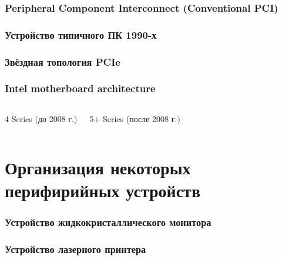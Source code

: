 \begin{frame}
\frametitle{Peripheral Component Interconnect (Conventional PCI)}
\end{frame}

\begin{frame}
\frametitle{Устройство типичного ПК 1990-х}
\end{frame}

\begin{frame}
\frametitle{Звёздная топология PCIe}
\end{frame}

\begin{frame}
\frametitle{Intel motherboard architecture}
\begin{columns}
    \column{6.3cm} 4 Series  (до 2008 г.) \\

    \pause \column{6.3cm} 5+ Series  (после 2008 г.) \\
\end{columns}
\end{frame}

\section{Организация некоторых перифирийных устройств}

\begin{frame}
\frametitle{Устройство жидкокристаллического монитора}
\end{frame}

\begin{frame}
\frametitle{Устройство лазерного принтера}
\end{frame}


